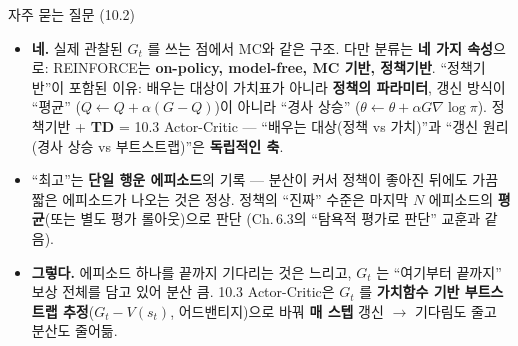 \documentclass[aspectratio=169,11pt]{beamer}
\begin{document}
\begin{frame}{자주 묻는 질문 (10.2)}
  \small
  \begin{itemize}
    \item {}
      \textbf{네.} 실제 관찰된 $G_t$ 를 쓰는 점에서 MC와 같은
      구조. 다만 분류는 \textbf{네 가지 속성}으로: REINFORCE는
      \textbf{on-policy, model-free, MC 기반, 정책기반}.
      ``정책기반''이 포함된 이유: 배우는 대상이 가치표가 아니라
      \textbf{정책의 파라미터}, 갱신 방식이 ``평균''
      ($Q \leftarrow Q + \alpha(G-Q)$)이 아니라 ``경사 상승''
      ($\theta \leftarrow \theta + \alpha G \nabla\log\pi$).
      정책기반 + \textbf{TD} = 10.3 Actor-Critic ---
      ``배우는 대상(정책 vs 가치)''과 ``갱신 원리(경사 상승 vs
      부트스트랩)''은 \textbf{독립적인 축}.
    \item {}
      ``최고''는 \textbf{단일 행운 에피소드}의 기록 --- 분산이
      커서 정책이 좋아진 뒤에도 가끔 짧은 에피소드가 나오는
      것은 정상. 정책의 ``진짜'' 수준은 마지막 $N$ 에피소드의
      \textbf{평균}(또는 별도 평가 롤아웃)으로 판단 (Ch.\,6.3의
      ``탐욕적 평가로 판단'' 교훈과 같음).
    \item {}
      \textbf{그렇다.} 에피소드 하나를 끝까지 기다리는 것은 느리고,
      $G_t$ 는 ``여기부터 끝까지'' 보상 전체를 담고 있어 분산 큼.
      10.3 Actor-Critic은 $G_t$ 를 \textbf{가치함수 기반 부트스트랩
      추정}($G_t - V(s_t)$, 어드밴티지)으로 바꿔 \textbf{매 스텝}
      갱신 $\to$ 기다림도 줄고 분산도 줄어듦.
  \end{itemize}
  \normalsize
\end{frame}

\end{document}
